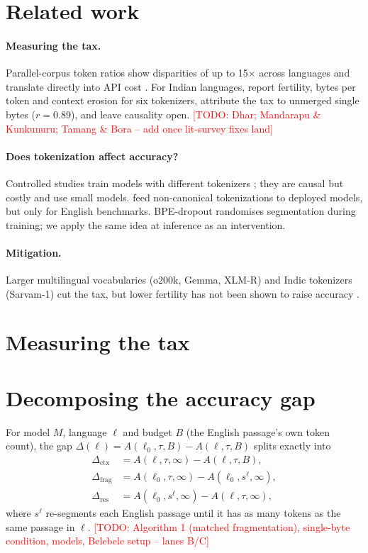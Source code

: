 \documentclass[11pt]{article}
\newcommand{\todo}[1]{\textcolor{red}{[TODO: #1]}}
\begin{document}
\section{Related work}
\paragraph{Measuring the tax.} Parallel-corpus token ratios show disparities of up to 15$\times$ across
languages \citep{petrov2023} and translate directly into API cost \citep{ahia2023}. For Indian languages,
\citet{srivastava2026} report fertility, bytes per token and context erosion for six tokenizers, attribute
the tax to unmerged single bytes ($r{=}0.89$), and leave causality open. \todo{Dhar; Mandarapu \& Kunkunuru; Tamang \& Bora -- add once lit-survey fixes land}
\paragraph{Does tokenization affect accuracy?} Controlled studies train models with different tokenizers
\citep{rust2021,ali2024}; they are causal but costly and use small models. \citet{zheng2025} feed
non-canonical tokenizations to deployed models, but only for English benchmarks. BPE-dropout
\citep{provilkov2020} randomises segmentation during training; we apply the same idea at inference as an intervention.
\paragraph{Mitigation.} Larger multilingual vocabularies (o200k, Gemma, XLM-R) and Indic tokenizers
(Sarvam-1) cut the tax, but lower fertility has not been shown to raise accuracy \citep{ali2024}.

\section{Measuring the tax}\label{sec:audit}


\section{Decomposing the accuracy gap}\label{sec:method}
For model $M$, language $\ell$ and budget $B$ (the English passage's own token count), the gap
$\Delta(\ell)=A(\ell_0,\tau,B)-A(\ell,\tau,B)$ splits exactly into
\begin{align*}
\Delta_{\mathrm{ctx}} &= A(\ell,\tau,\infty)-A(\ell,\tau,B),\\
\Delta_{\mathrm{frag}} &= A(\ell_0,\tau,\infty)-A(\ell_0,s^{\ell},\infty),\\
\Delta_{\mathrm{res}} &= A(\ell_0,s^{\ell},\infty)-A(\ell,\tau,\infty),
\end{align*}
where $s^{\ell}$ re-segments each English passage until it has as many tokens as the same passage in $\ell$.
\todo{Algorithm 1 (matched fragmentation), single-byte condition, models, Belebele setup -- lanes B/C}
\end{document}
